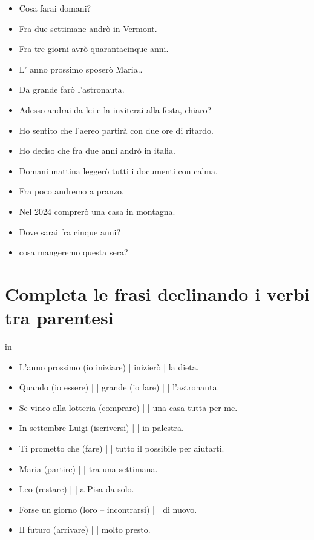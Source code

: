 \documentclass[letter,11pt]{article}
\begin{document}
\begin{multicols}{2}
\begin{itemize}
    \item Cosa farai domani?
    \item Fra due settimane andrò in Vermont.
    \item Fra tre giorni avrò quarantacinque anni.
    \item L' anno prossimo sposerò Maria..
    \item Da grande farò l'astronauta.
    \item Adesso andrai da lei e la  inviterai alla festa, chiaro?
    \item Ho sentito che l'aereo partirà con due ore di ritardo.
    \item Ho deciso che fra due anni andrò in italia.
    \item Domani mattina leggerò tutti i documenti con calma.
    \item Fra poco andremo a pranzo.
    \item Nel 2024 comprerò una casa in montagna.
    \item Dove sarai fra cinque anni?
    \item cosa mangeremo questa sera?

\end{itemize}
\end{multicols}


\section*{Completa le frasi declinando i verbi tra parentesi}
 in

\begin{multicols}{2}
\begin{itemize}
    \item L’anno prossimo (io iniziare) | inizierò | la dieta.
    \item Quando (io essere) |  | grande (io fare) |  | l’astronauta.
    \item Se vinco alla lotteria (comprare) |  | una casa tutta per me.
    \item In settembre Luigi (iscriversi) |  | in palestra.
    \item Ti prometto che (fare) |  | tutto il possibile per aiutarti.
    \item Maria (partire) |  | tra una settimana.
    \item Leo (restare) |  | a Pisa da solo.
    \item Forse un giorno (loro – incontrarsi) |  | di nuovo.
    \item Il futuro (arrivare) |  | molto presto.

\end{itemize}
\end{multicols}
\end{document}
